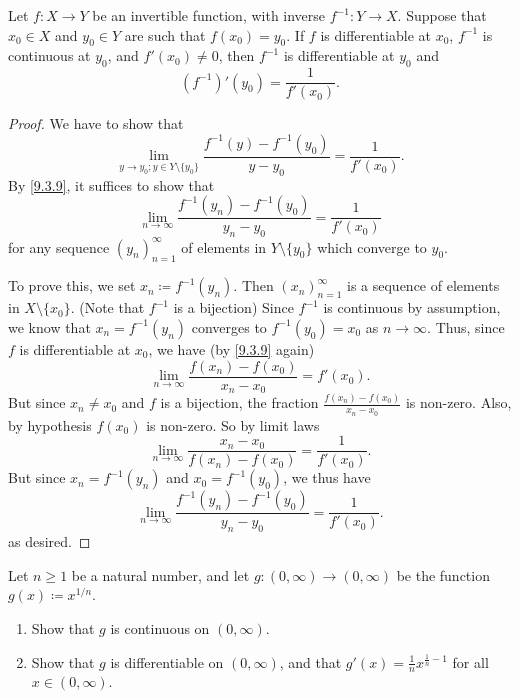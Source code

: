 \begin{thm}\label{10.4.2}
  Let \(f : X \to Y\) be an invertible function, with inverse \(f^{-1} : Y \to X\).
  Suppose that \(x_0 \in X\) and \(y_0 \in Y\) are such that \(f(x_0) = y_0\).
  If \(f\) is differentiable at \(x_0\), \(f^{-1}\) is continuous at \(y_0\), and \(f'(x_0 ) \neq 0\), then \(f^{-1}\) is differentiable at \(y_0\) and
  \[
    (f^{-1})'(y_0) = \frac{1}{f'(x_0)}.
  \]
\end{thm}

\begin{proof}
  We have to show that
  \[
    \lim_{y \to y_0 ; y \in Y \setminus \{y_0\}} \frac{f^{-1}(y) - f^{-1}(y_0)}{y - y_0} = \frac{1}{f'(x_0)}.
  \]
  By \cref{9.3.9}, it suffices to show that
  \[
    \lim_{n \to \infty} \frac{f^{-1}(y_n) - f^{-1}(y_0)}{y_n - y_0} = \frac{1}{f'(x_0)}
  \]
  for any sequence \((y_n)_{n = 1}^\infty\) of elements in \(Y \setminus \{y_0\}\) which converge to \(y_0\).

  To prove this, we set \(x_n \coloneqq f^{-1}(y_n)\).
  Then \((x_n)_{n = 1}^\infty\) is a sequence of elements in \(X \setminus \{x_0\}\).
  (Note that \(f^{-1}\) is a bijection)
  Since \(f^{-1}\) is continuous by assumption, we know that \(x_n = f^{-1}(y_n)\) converges to \(f^{-1}(y_0) = x_0\) as \(n \to \infty\).
  Thus, since \(f\) is differentiable at \(x_0\), we have (by \cref{9.3.9} again)
  \[
    \lim_{n \to \infty} \frac{f(x_n) - f(x_0)}{x_n - x_0} = f'(x_0).
  \]
  But since \(x_n \neq x_0\) and \(f\) is a bijection, the fraction \(\frac{f(x_n) - f(x_0)}{x_n - x_0}\) is non-zero.
  Also, by hypothesis \(f(x_0)\) is non-zero.
  So by limit laws
  \[
    \lim_{n \to \infty} \frac{x_n - x_0}{f(x_n) - f(x_0)} = \frac{1}{f'(x_0)}.
  \]
  But since \(x_n = f^{-1}(y_n)\) and \(x_0 = f^{-1}(y_0)\), we thus have
  \[
    \lim_{n \to \infty} \frac{f^{-1}(y_n) - f^{-1}(y_0)}{y_n - y_0} = \frac{1}{f'(x_0)}.
  \]
  as desired.
\end{proof}

\exercisesection

\begin{ex}\label{ex:10.4.1}
  Let \(n \geq 1\) be a natural number, and let \(g : (0, \infty) \to (0, \infty)\) be the function \(g(x) \coloneqq x^{1 / n}\).
  \begin{enumerate}
    \item Show that \(g\) is continuous on \((0, \infty)\).
    \item Show that \(g\) is differentiable on \((0, \infty)\), and that \(g'(x) = \frac{1}{n} x^{\frac{1}{n} - 1}\) for all \(x \in (0, \infty)\).
  \end{enumerate}
\end{ex}

